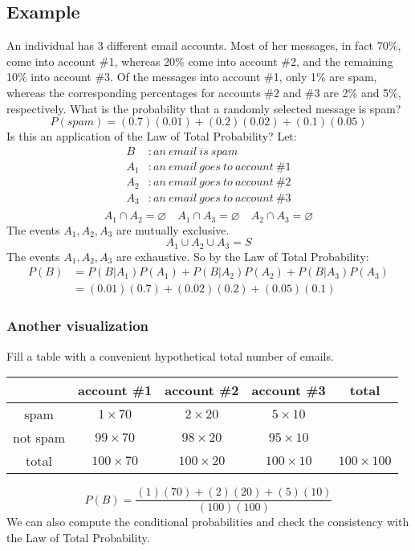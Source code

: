 \documentclass{math}
\begin{document}
\subsection*{Example}
An individual has 3 different email accounts. Most of her messages, in fact
70\%, come into account \#1, whereas 20\% come into account \#2, and the
remaining 10\% into account \#3. Of the messages into account \#1, only 1\% are
spam, whereas the corresponding percentages for accounts \#2 and \#3 are 2\%
and 5\%, respectively. What is the probability that a randomly selected message
is spam?
\[ P(spam) = (0.7)(0.01)+(0.2)(0.02)+(0.1)(0.05) \]
Is this an application of the Law of Total Probability? Let:
\begin{align*}
  B&: an\ email\ is\ spam \\
  A_{1}&: an\ email\ goes\ to\ account\ \#1 \\
  A_{2}&: an\ email\ goes\ to\ account\ \#2 \\
  A_{3}&: an\ email\ goes\ to\ account\ \#3 \\
\end{align*}
\[ A_{1} \cap A_{2} = \varnothing \quad A_{1} \cap A_{3} = \varnothing \quad
   A_{2} \cap A_{3} = \varnothing \]
The events \( A_{1}, A_{2}, A_{3} \) are mutually exclusive.
\[ A_{1} \cup A_{2} \cup A_{3} = S \]
The events \( A_{1}, A_{2}, A_{3} \) are exhaustive. So by the Law of Total
Probability:
\begin{align*}
  P(B) &= P(B|A_{1})P(A_{1})+P(B|A_{2})P(A_{2})+P(B|A_{3})P(A_{3}) \\
  &= (0.01)(0.7)+(0.02)(0.2)+(0.05)(0.1)
\end{align*}

\subsubsection*{Another visualization}
Fill a table with a convenient hypothetical total number of emails.
\begin{center}
  \begin{tabular}{|c|c|c|c|c|}
    \hline
    & account \#1 & account \#2 & account \#3 & total \\ \hline
    spam & \( 1 \times 70 \) & \( 2 \times 20 \) & \( 5 \times 10 \) & \\ \hline
    not spam & \( 99 \times 70 \) & \( 98 \times 20 \) & \( 95 \times 10 \) & \\
      \hline
    total & \( 100 \times 70 \) & \( 100 \times 20 \) & \( 100 \times 10 \) &
      \( 100 \times 100 \) \\ \hline
  \end{tabular}
\end{center}
\[ P(B) = \frac{(1)(70)+(2)(20)+(5)(10)}{(100)(100)} \]
We can also compute the conditional probabilities and check the consistency
with the Law of Total Probability.
\end{document}
